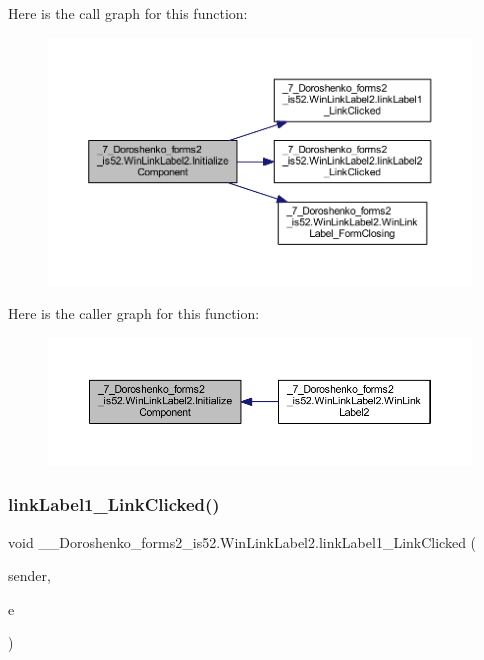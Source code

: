 Here is the call graph for this function\+:
\nopagebreak
\begin{figure}[H]
\begin{center}
\leavevmode
\includegraphics[width=350pt]{class__7___doroshenko__forms2__is52_1_1_win_link_label2_a8089cf25a364a03c2d9385ab3d74ec2e_cgraph}
\end{center}
\end{figure}
Here is the caller graph for this function\+:
\nopagebreak
\begin{figure}[H]
\begin{center}
\leavevmode
\includegraphics[width=350pt]{class__7___doroshenko__forms2__is52_1_1_win_link_label2_a8089cf25a364a03c2d9385ab3d74ec2e_icgraph}
\end{center}
\end{figure}
\hypertarget{class__7___doroshenko__forms2__is52_1_1_win_link_label2_a925937ae4cff4037bb5bfe92613de2f7}{}\label{class__7___doroshenko__forms2__is52_1_1_win_link_label2_a925937ae4cff4037bb5bfe92613de2f7} 
\subsubsection{\texorpdfstring{link\+Label1\+\_\+\+Link\+Clicked()}{linkLabel1\_LinkClicked()}}
{\footnotesize\ttfamily void \+\_\+\_\+\+Doroshenko\+\_\+forms2\+\_\+is52.\+Win\+Link\+Label2.\+link\+Label1\+\_\+\+Link\+Clicked (\begin{DoxyParamCaption}\item[{object}]{sender,  }\item[{Link\+Label\+Link\+Clicked\+Event\+Args}]{e }\end{DoxyParamCaption})\hspace{0.3cm}{\ttfamily [private]}}

